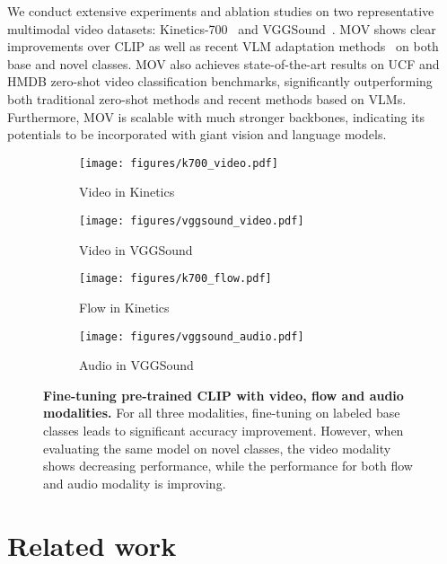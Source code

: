 \documentclass{article}
\begin{document}
We conduct extensive experiments and ablation studies on two representative multimodal video datasets: Kinetics-700~\cite{carreira2019short} and VGGSound~\cite{chen2020vggsound}. MOV shows clear improvements over CLIP as well as recent VLM adaptation methods~\cite{zhou2021coop, gao2021clip} on both base and novel classes. 
MOV also achieves state-of-the-art results on UCF and HMDB zero-shot video classification benchmarks, significantly outperforming both traditional zero-shot methods and recent methods based on VLMs. 
Furthermore, MOV is scalable with much stronger backbones, indicating its potentials to be incorporated with giant vision and language models.


\begin{figure}[t]
 \centering
 \begin{subfigure}[b]{0.23\linewidth}
     \centering
     \texttt{[image: figures/k700\_video.pdf]}
     \caption{Video in Kinetics}
     \label{fig:modality_generalization_k700_video}
 \end{subfigure}
 \hfill
 \begin{subfigure}[b]{0.23\linewidth}
     \centering
     \texttt{[image: figures/vggsound\_video.pdf]}
     \caption{Video in VGGSound}
     \label{fig:modality_generalization_vgg_video}
 \end{subfigure}
 \hfill
 \begin{subfigure}[b]{0.23\linewidth}
     \centering
     \texttt{[image: figures/k700\_flow.pdf]}
     \caption{Flow in Kinetics}
     \label{fig:modality_generalization_k700_flow}
 \end{subfigure}
 \hfill
 \begin{subfigure}[b]{0.23\linewidth}
     \centering
     \texttt{[image: figures/vggsound\_audio.pdf]}
     \caption{Audio in VGGSound}
     \label{fig:modality_generalization_vgg_audio}
 \end{subfigure}
    \caption{\textbf{Fine-tuning pre-trained CLIP with video, flow and audio modalities.} For all three modalities, fine-tuning on labeled base classes leads to significant accuracy improvement. However, when evaluating the same model on novel classes, the video modality shows decreasing performance, while the performance for both flow and audio modality is improving.}
\label{fig:modality_generalization}
\end{figure}


\section{Related work}
\label{sec:related_work}
\end{document}
